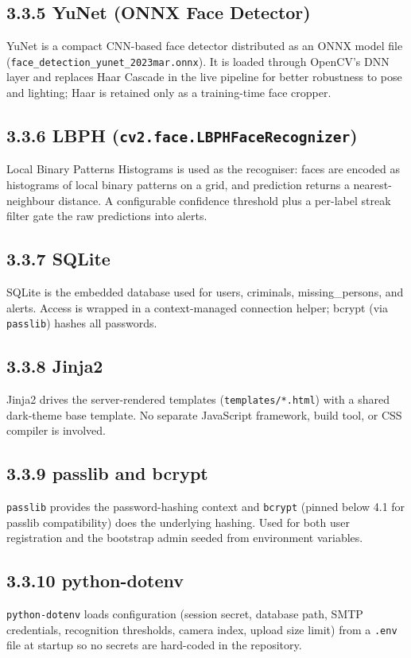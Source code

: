\documentclass[11pt]{report}
\begin{document}
\subsection*{3.3.5 YuNet (ONNX Face Detector)}
YuNet is a compact CNN-based face detector distributed as an ONNX model file (\texttt{face\_detection\_yunet\_2023mar.onnx}). It is loaded through OpenCV's DNN layer and replaces Haar Cascade in the live pipeline for better robustness to pose and lighting; Haar is retained only as a training-time face cropper.

\subsection*{3.3.6 LBPH (\texttt{cv2.face.LBPHFaceRecognizer})}
Local Binary Patterns Histograms is used as the recogniser: faces are encoded as histograms of local binary patterns on a grid, and prediction returns a nearest-neighbour distance. A configurable confidence threshold plus a per-label streak filter gate the raw predictions into alerts.

\subsection*{3.3.7 SQLite}
SQLite is the embedded database used for users, criminals, missing\_persons, and alerts. Access is wrapped in a context-managed connection helper; bcrypt (via \texttt{passlib}) hashes all passwords.

\subsection*{3.3.8 Jinja2}
Jinja2 drives the server-rendered templates (\texttt{templates/*.html}) with a shared dark-theme base template. No separate JavaScript framework, build tool, or CSS compiler is involved.

\subsection*{3.3.9 passlib and bcrypt}
\texttt{passlib} provides the password-hashing context and \texttt{bcrypt} (pinned below 4.1 for passlib compatibility) does the underlying hashing. Used for both user registration and the bootstrap admin seeded from environment variables.

\subsection*{3.3.10 python-dotenv}
\texttt{python-dotenv} loads configuration (session secret, database path, SMTP credentials, recognition thresholds, camera index, upload size limit) from a \texttt{.env} file at startup so no secrets are hard-coded in the repository.
\end{document}
